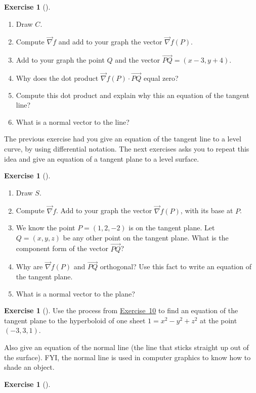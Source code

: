 \documentclass[10pt,]{book}
\theoremstyle{plain}
\theoremstyle{definition}
\theoremstyle{definition}
\theoremstyle{definition}
\theoremstyle{definition}
\newtheorem{exploration}[project]{Exercise}
\theoremstyle{definition}
\numberwithin{equation}{section}
\begin{document}
\begin{exploration}[]\label{exploration-232}
\leavevmode%
\begin{enumerate}[font=\bfseries,label=(\alph*),ref=\alph*]
\item\label{task-619} Draw \(C\).%
\item\label{task-620} Compute \(\vec \nabla f\) and add to your graph the vector \(\vec \nabla f(P)\).%
\item\label{task-621} Add to your graph the point \(Q\) and the vector \(\vec {PQ} = (x-3,y+4)\).%
\item\label{task-622} Why does the dot product \(\vec \nabla f(P)\cdot\vec{PQ}\) equal zero?%
\item\label{task-623} Compute this dot product and explain why this an equation of the tangent line?%
\item\label{task-624} What is a normal vector to the line?%
\end{enumerate}
\end{exploration}
The previous exercise had you give an equation of the tangent line to a level curve, by using differential notation. The next exercises asks you to repeat this idea and give an equation of a tangent plane to a level surface.%
\begin{exploration}[]\label{prob_gradient_to_tangent_practice}
\leavevmode%
\begin{enumerate}[font=\bfseries,label=(\alph*),ref=\alph*]
\item\label{task-625} Draw \(S\).%
\item\label{task-626} Compute \(\vec \nabla f\). Add to your graph the vector \(\vec \nabla f(P)\), with its base at \(P\).%
\item\label{task-627} We know the point \(P=(1,2,-2)\) is on the tangent plane. Let \(Q=(x,y,z)\) be any other point on the tangent plane.  What is the component form of the vector \(\vec {PQ}\)?%
\item\label{task-628} Why are  \(\vec \nabla f(P)\) and \(\vec{PQ}\) orthogonal? Use this fact to write an equation of the tangent plane.%
\item\label{task-629} What is a normal vector to the plane?%
\end{enumerate}
\end{exploration}
\begin{exploration}[]\label{exploration-234}
Use the process from \hyperref[prob_gradient_to_tangent_practice]{Exercise~10} to find an equation of the tangent plane to the hyperboloid of one sheet \(1=x^2-y^2+z^2\) at the point \((-3,3,1)\).%
\par
Also give an equation of the normal line (the line that sticks straight up out of the surface). FYI, the normal line is used in computer graphics to know how to shade an object.%
\end{exploration}
\begin{exploration}[]\label{exploration-235}
\end{exploration}
\typeout{************************************************}
\typeout{************************************************}
\end{document}
